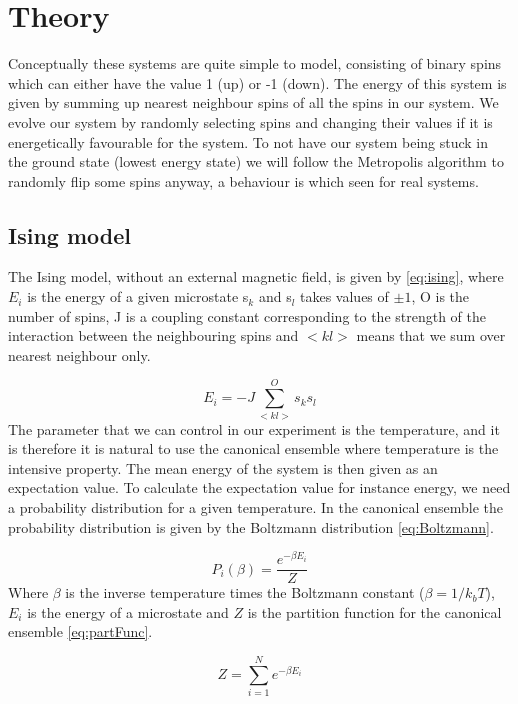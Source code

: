 \section{Theory}

Conceptually these systems are quite simple to model,
consisting of binary spins which can either have the value 1 (up) or -1 (down).
The energy of this system is given by summing up nearest neighbour spins of all
the spins in our system. We evolve our system by randomly selecting spins and
changing their values if it is energetically favourable for the system. To not
have our system being stuck in the ground state (lowest energy state) we will
follow the Metropolis algorithm to randomly flip some spins anyway, a
behaviour is which seen for real systems.


\subsection{Ising model}
The Ising model, without an external magnetic field, is given by
\cref{eq:ising}, where $E_i$ is the energy of a given microstate s$_k$ and s$_l$ takes values of $\pm 1$, O is the
number of spins, J is a coupling constant corresponding to the strength of the
interaction between the neighbouring spins and $<kl>$ means that we sum over
nearest neighbour only.

\begin{equation}\label{eq:ising}
  E_i = -J\sum_{<kl>}^{O} s_k s_l
\end{equation}
The parameter that we can control in our experiment is the temperature, and it
is therefore it is natural to
use the canonical ensemble where temperature is the intensive property. The
mean energy of the system is then given as an expectation value. To calculate
the expectation value for instance energy, we need a probability distribution
for a given temperature. In the canonical ensemble the probability distribution
is given by the Boltzmann distribution \cref{eq:Boltzmann}.

\begin{equation}\label{eq:Boltzmann}
  P_i(\beta) = \frac{e^{-\beta E_i}}{Z}
\end{equation}
Where $\beta$ is the inverse temperature times the Boltzmann constant
($\beta = 1/k_bT $),  $E_i$ is the energy of a microstate and $Z$
 is the partition function for the canonical ensemble \cref{eq:partFunc}.

\begin{equation}\label{eq:partFunc}
  Z = \sum_{i=1}^{N} e^{-\beta E_i}
\end{equation}

